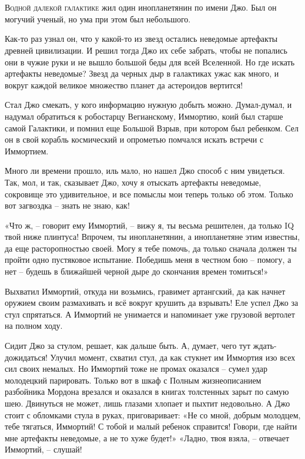 \documentclass[ebook,oneside,final,openright]{memoir}
\begin{document}
\chapter{}
 \lettrine{В}{одной далекой галактике} жил один инопланетянин по имени Джо. Был он могучий ученый, но ума при этом был небольшого.\par
\par
Как-то раз узнал он, что у какой-то из звезд остались неведомые артефакты древней цивилизации. И решил тогда Джо их себе забрать, чтобы не попались они в чужие руки и не вышло большой беды для всей Вселенной. Но где искать артефакты неведомые? Звезд да черных дыр в галактиках ужас как много, и вокруг каждой великое множество планет да астероидов вертится!\par
\par
Стал Джо смекать, у кого информацию нужную добыть можно. Думал-думал, и надумал обратиться к робостарцу Вегианскому, Иммортию, коий был старше самой Галактики, и помнил еще Большой Взрыв, при котором был ребенком. Сел он в свой корабль космический и опрометью помчался искать встречи с Иммортием.\par
\par
Много ли времени прошло, иль мало, но нашел Джо способ с ним увидеться. Так, мол, и так, сказывает Джо, хочу я отыскать артефакты неведомые, сокровище это удивительное, и все помыслы мои теперь только об этом. Только вот загвоздка – знать не знаю, как!\par
\par
«Что ж, – говорит ему Иммортий, – вижу я, ты весьма решителен, да только IQ твой ниже плинтуса! Впрочем, ты инопланетянин, а инопланетяне этим известны, да еще расторопностью своей. Могу я тебе помочь, да только сначала должен ты пройти одно пустяковое испытание. Победишь меня в честном бою – помогу, а нет – будешь в ближайшей черной дыре до скончания времен томиться!» \par
\par
Выхватил Иммортий, откуда ни возьмись, гравимет артангский, да как начнет оружием своим размахивать и всё вокруг крушить да взрывать! Еле успел Джо за стул спрятаться. А Иммортий не унимается и напоминает уже грузовой вертолет на полном ходу. \par
\par
Сидит Джо за стулом, решает, как дальше быть. А, думает, чего тут ждать-дожидаться! Улучил момент, схватил стул, да как стукнет им Иммортия изо всех сил своих немалых. Но Иммортий тоже не промах оказался – сумел удар молодецкий парировать. Только вот в шкаф с Полным жизнеописанием разбойника Мордона врезался и оказался в книгах толстенных зарыт по самую шею. Двинуться не может, лишь глазами хлопает и пыхтит недовольно. А Джо стоит с обломками стула в руках, приговаривает: «Не со мной, добрым молодцем, тебе тягаться, Иммортий! С тобой и малый ребенок справится! Говори, где найти мне артефакты неведомые, а не то хуже будет!» «Ладно, твоя взяла, – отвечает Иммортий, – слушай!\par
\end{document}
